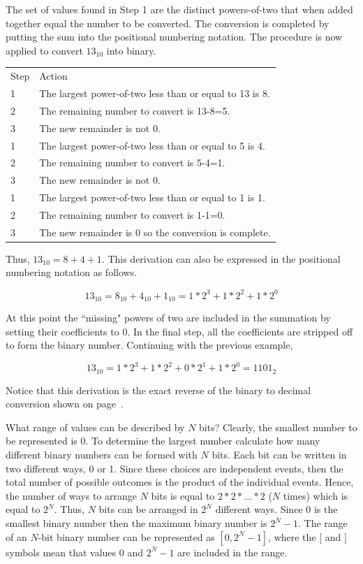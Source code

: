 The set of values found in Step 1 are the distinct powers-of-two that
when added together equal the number to be converted.  The conversion
is completed by putting the sum into the positional numbering notation.  
The procedure is now applied to convert $13_{10}$ into binary.

\begin{tabular}{ll}
Step & Action \\
1 & The largest power-of-two less than or equal to 13 is 8. \\
2 & The remaining number to convert is 13-8=5. \\
3 & The new remainder is not 0. \\
1 & The largest power-of-two less than or equal to 5 is 4. \\
2 & The remaining number to convert is 5-4=1. \\
3 & The new remainder is not 0. \\
1 & The largest power-of-two less than or equal to 1 is 1. \\
2 & The remaining number to convert is 1-1=0. \\
3 & The new remainder is 0 so the conversion is complete. \\
\end{tabular}

Thus, $13_{10} = 8+4+1$.  This derivation can also be expressed in the
positional numbering notation as follows.

$$13_{10} = 8_{10} + 4_{10} + 1_{10} = 1*2^3 + 1*2^2 + 1*2^0 $$

At this point the ``missing" powers of two are included in the
summation by setting their coefficients to 0.  In the final step, all
the coefficients are stripped off to form the binary number.  Continuing
with the previous example,

$$13_{10} = 1*2^3 + 1*2^2 + 0*2^1 + 1*2^0 = 1101_2$$

Notice that this derivation is the exact reverse of the binary to
decimal conversion shown on page~\pageref{page:bin2dec}.  


\label{page:two-to-N}
What range of values can be described by $N$ bits?  Clearly, the smallest 
number to be represented is 0.  To determine the largest number 
calculate how many different binary numbers can be formed with $N$ bits.
Each bit can be written in two different ways, 0 or 1. Since these choices
are independent events, then the total number of 
possible outcomes is the product of the individual events.  Hence, the 
number of ways to arrange $N$ bits is equal to $2*2* \ldots *2$ ($N$ times) 
which is equal to $2^N$.  Thus, $N$ bits can be arranged in $2^N$ different 
ways. Since 0 is the smallest binary number then the maximum binary number
is $2^N-1$.  The range of an $N$-bit binary number can be represented
as $[0,2^{N}-1]$, where the $[$ and $]$ symbols mean that values 0 and
$2^{N}-1$ are included in the range. 


